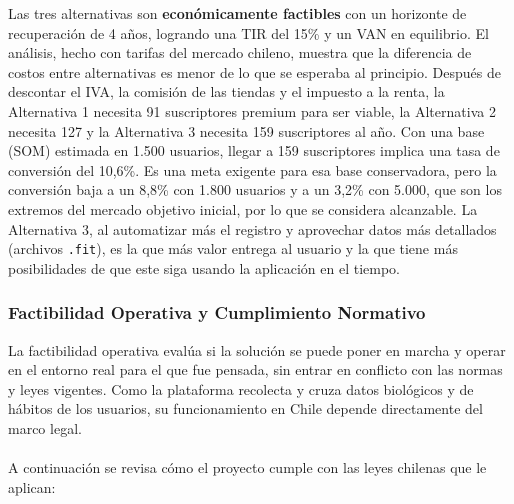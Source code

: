 Las tres alternativas son \textbf{económicamente factibles} con un horizonte de recuperación de 4 años, logrando una TIR del 15\% y un VAN en equilibrio. El análisis, hecho con tarifas del mercado chileno, muestra que la diferencia de costos entre alternativas es menor de lo que se esperaba al principio. Después de descontar el IVA, la comisión de las tiendas y el impuesto a la renta, la Alternativa 1 necesita 91 suscriptores premium para ser viable, la Alternativa 2 necesita 127 y la Alternativa 3 necesita 159 suscriptores al año. Con una base (SOM) estimada en 1.500 usuarios, llegar a 159 suscriptores implica una tasa de conversión del 10,6\%. Es una meta exigente para esa base conservadora, pero la conversión baja a un 8,8\% con 1.800 usuarios y a un 3,2\% con 5.000, que son los extremos del mercado objetivo inicial, por lo que se considera alcanzable. La Alternativa 3, al automatizar más el registro y aprovechar datos más detallados (archivos \texttt{.fit}), es la que más valor entrega al usuario y la que tiene más posibilidades de que este siga usando la aplicación en el tiempo.
\subsubsection{Factibilidad Operativa y Cumplimiento Normativo}
La factibilidad operativa evalúa si la solución se puede poner en marcha y operar en el entorno real para el que fue pensada, sin entrar en conflicto con las normas y leyes vigentes. Como la plataforma recolecta y cruza datos biológicos y de hábitos de los usuarios, su funcionamiento en Chile depende directamente del marco legal.
\\\\
A continuación se revisa cómo el proyecto cumple con las leyes chilenas que le aplican:

